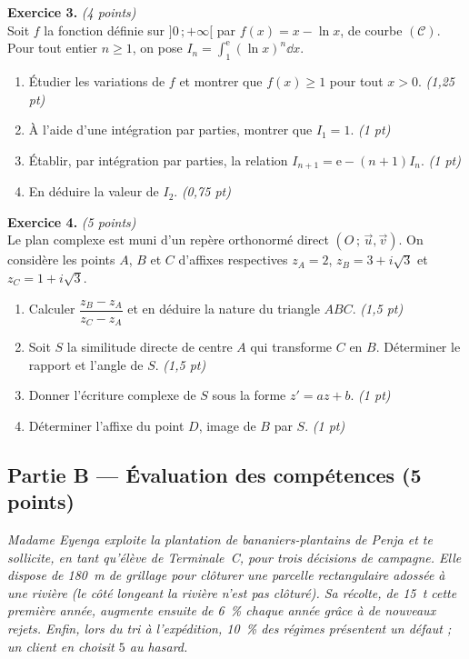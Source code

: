 \smallskip
\noindent\textbf{Exercice 3.} \hfill\textit{(4 points)}\\
Soit $f$ la fonction définie sur $]0\,;+\infty[$ par $f(x)=x-\ln x$, de courbe $(\mathcal{C})$.
Pour tout entier $n\ge 1$, on pose $\displaystyle I_n=\int_1^{\mathrm{e}}(\ln x)^{n}\dd x$.
\begin{enumerate}[label=\arabic*)]
\item Étudier les variations de $f$ et montrer que $f(x)\ge 1$ pour tout $x>0$. \hfill\textit{(1,25 pt)}
\item À l'aide d'une intégration par parties, montrer que $I_1=1$. \hfill\textit{(1 pt)}
\item Établir, par intégration par parties, la relation $I_{n+1}=\mathrm{e}-(n+1)I_n$. \hfill\textit{(1 pt)}
\item En déduire la valeur de $I_2$. \hfill\textit{(0,75 pt)}
\end{enumerate}

\smallskip
\noindent\textbf{Exercice 4.} \hfill\textit{(5 points)}\\
Le plan complexe est muni d'un repère orthonormé direct $(O\,;\,\vec u,\vec v)$. On
considère les points $A$, $B$ et $C$ d'affixes respectives $z_A=2$, $z_B=3+i\sqrt3$ et $z_C=1+i\sqrt3$.
\begin{enumerate}[label=\arabic*)]
\item Calculer $\dfrac{z_B-z_A}{z_C-z_A}$ et en déduire la nature du triangle $ABC$. \hfill\textit{(1,5 pt)}
\item Soit $S$ la similitude directe de centre $A$ qui transforme $C$ en $B$. Déterminer
le rapport et l'angle de $S$. \hfill\textit{(1,5 pt)}
\item Donner l'écriture complexe de $S$ sous la forme $z'=az+b$. \hfill\textit{(1 pt)}
\item Déterminer l'affixe du point $D$, image de $B$ par $S$. \hfill\textit{(1 pt)}
\end{enumerate}

\subsection*{Partie B — Évaluation des compétences \hfill (5 points)}

\noindent\textit{Madame Eyenga exploite la plantation de bananiers-plantains de Penja et
te sollicite, en tant qu'élève de Terminale~C, pour trois décisions de campagne. Elle
dispose de \SI{180}{\metre} de grillage pour clôturer une parcelle rectangulaire
\emph{adossée à une rivière} (le côté longeant la rivière n'est pas clôturé). Sa récolte,
de \SI{15}{\tonne} cette première année, augmente ensuite de \SI{6}{\percent} chaque année
grâce à de nouveaux rejets. Enfin, lors du tri à l'expédition, \SI{10}{\percent} des
régimes présentent un défaut ; un client en choisit $5$ au hasard.}

